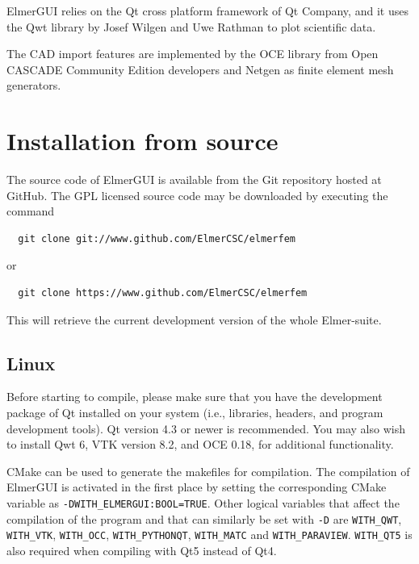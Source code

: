 ElmerGUI relies on the Qt cross platform framework of Qt Company\cite{QtHome}, and it uses the Qwt
library by Josef Wilgen and Uwe Rathman\cite{QwtHome} to plot scientific data.

The CAD import features are implemented by the OCE library from Open CASCADE Community Edition developers\cite{OCCHome} 
and Netgen\cite{NetgenHome} as finite element mesh generators.

\chapter{Installation from source}

The source code of ElmerGUI is available from the Git repository hosted at GitHub. The GPL
licensed source code may be downloaded by executing the command 
\begin{verbatim}
  git clone git://www.github.com/ElmerCSC/elmerfem
\end{verbatim}
or
\begin{verbatim}
  git clone https://www.github.com/ElmerCSC/elmerfem
\end{verbatim}
\noindent This will retrieve the current development version of the whole Elmer-suite.

\section{Linux}

Before starting to compile, please make sure that you have the development package of Qt
installed on your system (i.e., libraries, headers, and program development tools). Qt version 4.3
or newer is recommended. You may also wish to install Qwt 6,
VTK version 8.2,
and OCE 0.18, for additional functionality. 

CMake can be used to generate the makefiles for compilation. The compilation of ElmerGUI is activated 
in the first place by setting the corresponding CMake variable as {\tt -DWITH\_ELMERGUI:BOOL=TRUE}. 
Other logical variables that affect the compilation of the program and that can similarly be set 
with {\tt -D} are {\tt WITH\_QWT}, {\tt WITH\_VTK},
{\tt WITH\_OCC}, {\tt WITH\_PYTHONQT},
{\tt WITH\_MATC} and {\tt WITH\_PARAVIEW}. {\tt WITH\_QT5} is also required when compiling with Qt5 instead of Qt4.

